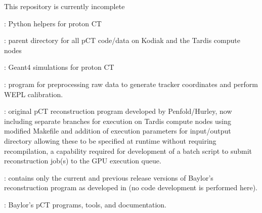 \begin{tcbfunctionenv}
\begin{tcbparagraph}
\begin{deepList}[labelindent=1pt, leftmargin=*]
\begin{deepList}[labelindent=1pt, leftmargin=*]
This repository is currently incomplete
		\item {} : Python helpers for proton CT
		\item {} : parent directory for all pCT code/data on Kodiak and the Tardis compute nodes
		\item {} : Geant4 simulations for proton CT
		\item {} : program for preprocessing raw data to generate tracker coordinates and perform WEPL calibration.
		\item {} : original pCT reconstruction program developed by Penfold/Hurley, now including separate branches for execution on Tardis compute nodes using modified Makefile and addition of execution parameters for input/output directory allowing these to be specified at runtime without requiring recompilation, a capability required for development of a batch script to submit reconstruction job(s) to the GPU execution queue.
		\item {} : contains only the current and previous release versions of Baylor's reconstruction program as developed in  (no code development is performed here).
	\end{deepList}
\newpage
	\item {} : Baylor's pCT programs, tools, and documentation.
	\begin{deepList}[labelindent=1pt, leftmargin=*]

\end{deepList}
\end{deepList}
\end{tcbparagraph}
\end{tcbfunctionenv}
